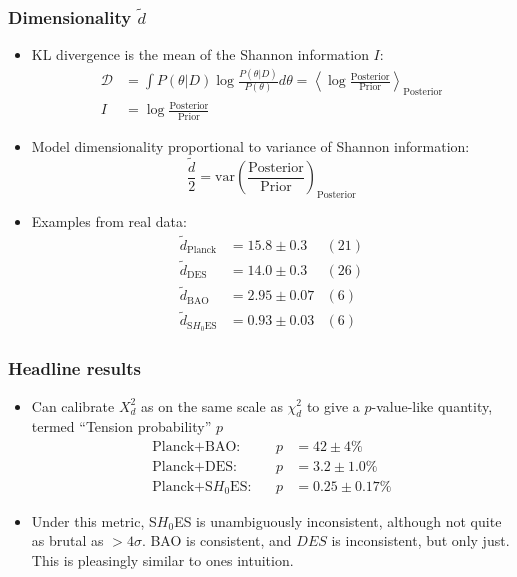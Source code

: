 \documentclass[aspectratio=169, handout]{beamer}
\begin{document}
\begin{frame}
    \frametitle{Dimensionality $\tilde{d}$}
    \begin{itemize}
        \item KL divergence is the mean of the Shannon information $I$:
            \begin{align}
                \mathcal{D} &= \int P(\theta|D) \log \frac{P(\theta|D)}{P(\theta)} d\theta = \left\langle\log\frac{\text{Posterior}}{\text{Prior}}\right\rangle_\text{Posterior}\nonumber\\
                I &= \log\frac{\text{Posterior}}{\text{Prior}}\nonumber
            \end{align}
        \item Model dimensionality proportional to variance of Shannon information:
            \[
                \frac{\tilde{d}}{2} = \text{var}\left(\frac{\text{Posterior}}{\text{Prior}}\right)_\text{Posterior}
            \]
        \item Examples from real data:
            \begin{align}
                \tilde{d}_\text{Planck} &= 15.8 \pm  0.3 &(21) \nonumber\\
                \tilde{d}_\text{DES} &= 14.0 \pm  0.3 &(26) \nonumber\\
                \tilde{d}_\text{BAO} &= 2.95 \pm  0.07 &(6) \nonumber\\
                \tilde{d}_\text{S$H_0$ES} &= 0.93 \pm  0.03 &(6) \nonumber
            \end{align}
    \end{itemize}

\end{frame}

\begin{frame}
    \frametitle{Headline results}
    \begin{itemize}
        \item Can calibrate $X^2_d$ as on the same scale as $\chi^2_d$ to give a $p$-value-like quantity, termed ``Tension probability'' $p$
            \begin{align}
                \text{Planck+BAO}:&      &p&=  42 \pm     4 \% \nonumber\\
                \text{Planck+DES}:&      &p&=   3.2 \pm     1.0 \% \nonumber\\
                \text{Planck+S$H_0$ES}:& &p&=   0.25 \pm     0.17 \% \nonumber
            \end{align}
        \item Under this metric, S$H_0$ES is unambiguously inconsistent, although not quite as brutal as $>4\sigma$. BAO is consistent, and $DES$ is inconsistent, but only just. This is pleasingly similar to ones intuition.
    \end{itemize}
\end{frame}
\end{document}
